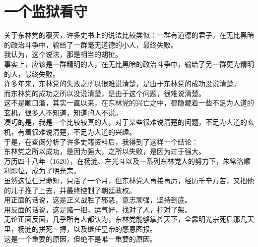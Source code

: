 \section{一个监狱看守}
\ifnum{}
	\begin{multicols}{\theparacolNo}
\fi
关于东林党的覆灭，许多史书上的说法比较类似：一群有道德的君子，在无比黑暗的政治斗争中，输给了一群毫无道德的小人，最终失败。\\

我认为，这个说法，那是相当的胡扯。\\

事实上，应该是一群精明的人，在无比黑暗的政治斗争中，输给了另一群更为精明的人，最终失败。\\

许多年来，东林党的失败之所以很难说清楚，是由于东林党的成功没说清楚。\\

而东林党的成功之所以没说清楚，是由于这个问题，很难说清楚。\\

这不是顺口溜，其实一直以来，在东林党的兴亡之中，都隐藏着一些不足为人道的玄机，很多人不知道，知道的人不说。\\

凑巧的是，我是一个比较较真的人，对于某些很难说清楚的问题，不足为人道的玄机，有着很难说清楚，不足为人道的兴趣。\\

于是，在查阅分析了许多史籍资料后，我得到了这样一个结论：\\

东林党之所以成功，是因为强大，之所以失败，是因为过于强大。\\

万历四十八年（1620），在杨涟、左光斗以及一系列东林党人的努力下，朱常洛顺利即位，成为了明光宗。\\

虽然这位仁兄命短，只活了一个月，但东林党人再接再厉，经历千辛万苦，又把他的儿子推了上去，并最终控制了朝廷政权。\\

用正面的话说，这是正义战胜了邪恶，意志顽强，坚持到底。\\

用反面的话说，这是赌一把，运气好，找对了人，打对了架。\\

无论正面反面，几乎所有人都认为，东林党能够掌控天下，全靠明光宗死后那几天里，杨涟的拼死一搏，以及继任皇帝的感恩图报。\\

这是一个重要的原因，但绝不是唯一重要的原因。\\


\end{multicols}
